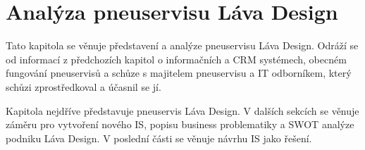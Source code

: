 \chapter{Analýza pneuservisu Láva Design}
Tato kapitola se věnuje představení a analýze pneuservisu Láva Design. Odráží se od informací z předchozích kapitol o informačních a CRM systémech, obecném fungování pneuservisů a schůze s majitelem pneuservisu a IT odborníkem, který schůzi zprostředkoval a účasnil se jí.

Kapitola nejdříve představuje pneuservis Láva Design. V dalších sekcích se věnuje záměru pro vytvoření nového IS, popisu business problematiky a SWOT analýze podniku Láva Design. V poslední části se věnuje návrhu IS jako řešení.




